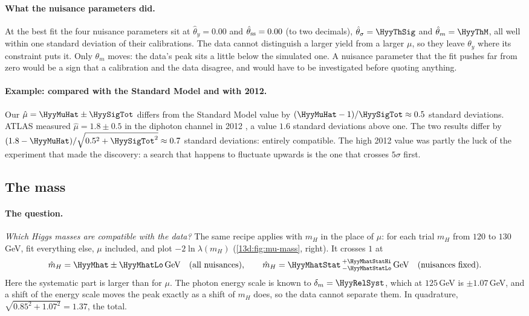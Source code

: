 \paragraph{What the nuisance parameters did.}
At the best fit the four nuisance parameters sit at $\hat\theta_y=0.00$ and
$\hat\theta_{\rm ss}=0.00$ (to two decimals), $\hat\theta_\sigma=\HyyThSig$ and
$\hat\theta_m=\HyyThM$, all well within one standard deviation of their calibrations. The data cannot distinguish
a larger yield from a larger $\mu$, so they leave $\theta_y$ where its constraint puts it.
Only $\theta_m$ moves: the data's peak sits a little below the simulated one. A nuisance
parameter that the fit pushes far from zero would be a sign that a calibration and the
data disagree, and would have to be investigated before quoting anything.

\paragraph{Example: compared with the Standard Model and with 2012.}
Our $\hat\mu=\HyyMuHat\pm\HyySigTot$ differs from the Standard Model value by
$(\HyyMuHat-1)/\HyySigTot\approx0.5$ standard deviations. ATLAS measured
$\hat\mu=1.8\pm0.5$ in the diphoton channel in 2012 , a
value $1.6$ standard deviations above one. The two results differ by
$(1.8-\HyyMuHat)/\sqrt{0.5^2+\HyySigTot^2}\approx0.7$ standard deviations: entirely
compatible. The high 2012 value was partly the luck of the experiment that made the
discovery: a search that happens to fluctuate upwards is the one that crosses $5\sigma$
first.

\subsection{The mass}
\label{13d:sec:mass}

\paragraph{The question.}
\emph{Which Higgs masses are compatible with the data?} The same recipe applies with $m_H$
in the place of $\mu$: for each trial $m_H$ from $120$ to $130\,$GeV, fit everything else,
$\mu$ included, and plot $-2\ln\lambda(m_H)$ (\cref{13d:fig:mu-mass}, right). It crosses
$1$ at
\[
  \hat m_H=\HyyMhat\pm\HyyMhatLo\,\text{GeV}
  \quad\text{(all nuisances)},\qquad
  \hat m_H=\HyyMhatStat\,^{+\HyyMhatStatHi}_{-\HyyMhatStatLo}\,\text{GeV}
  \quad\text{(nuisances fixed)}.
\]
Here the systematic part is larger than for $\mu$. The photon energy scale is known to
$\delta_m=\HyyRelSyst$, which at $125\,$GeV is $\pm1.07\,$GeV, and a shift of the energy
scale moves the peak exactly as a shift of $m_H$ does, so the data cannot separate them.
In quadrature, $\sqrt{0.85^2+1.07^2}=1.37$, the total.

